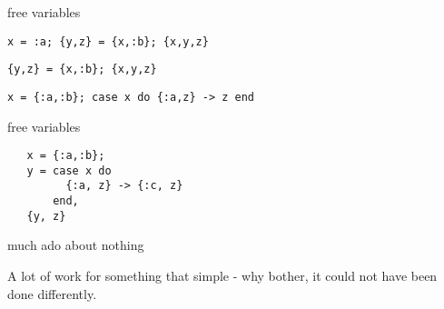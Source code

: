 \begin{frame}{free variables}

{\tt x = :a; \{y,z\} = \{x,:b\}; \{x,y,z\}}

\pause\vspace{20pt}

{\tt \{y,z\} = \{x,:b\}; \{x,y,z\}}

\pause\vspace{20pt}

{\tt x = \{:a,:b\}; case x do \{:a,z\} -> z end}

\end{frame}

\begin{frame}[fragile]{free variables}

\vspace{20pt}

\hspace{20pt}
\begin{verbatim}
   x = {:a,:b};
   y = case x do
         {:a, z} -> {:c, z}
       end,
   {y, z}
\end{verbatim}


\end{frame}
 

\begin{frame}{much ado about nothing}

A lot of work for something that simple - why bother, it could not have
been done differently.
\end{frame}



